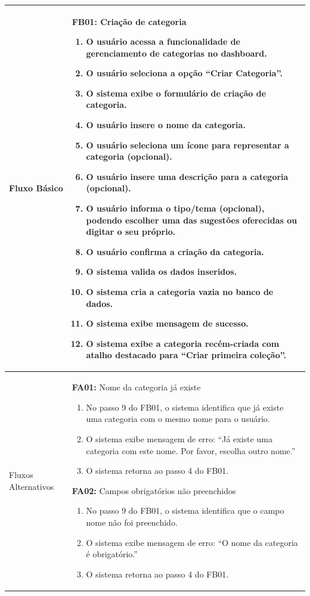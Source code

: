 \begin{longtable}{ >{\raggedright}p{2.8cm} | >{\raggedright\arraybackslash}p{10.7cm} }
Fluxo Básico & \mbox{}
\textbf{FB01:} Criação de categoria
\vspace{2pt}
\begin{enumerate}[nosep,leftmargin=1.2em,topsep=0pt,partopsep=0pt,parsep=0pt,itemsep=0pt,after=\vspace{2pt}]
	\item O usuário acessa a funcionalidade de gerenciamento de categorias no dashboard.
	\item O usuário seleciona a opção ``Criar Categoria''.
	\item O sistema exibe o formulário de criação de categoria.
	\item O usuário insere o nome da categoria.
	\item O usuário seleciona um ícone para representar a categoria (opcional).
	\item O usuário insere uma descrição para a categoria (opcional).
	\item O usuário informa o tipo/tema (opcional), podendo escolher uma das sugestões oferecidas ou digitar o seu próprio.
	\item O usuário confirma a criação da categoria.
	\item O sistema valida os dados inseridos.
	\item O sistema cria a categoria vazia no banco de dados.
	\item O sistema exibe mensagem de sucesso.
	\item O sistema exibe a categoria recém-criada com atalho destacado para ``Criar primeira coleção''.
\end{enumerate}
\mbox{} \\ \hline

Fluxos Alternativos & \mbox{}
\textbf{FA01:} Nome da categoria já existe
\vspace{2pt}
\begin{enumerate}[nosep,leftmargin=1.2em,topsep=0pt,partopsep=0pt,parsep=0pt,itemsep=0pt,after=\vspace{2pt}]
	\item No passo 9 do FB01, o sistema identifica que já existe uma categoria com o mesmo nome para o usuário.
	\item O sistema exibe mensagem de erro: ``Já existe uma categoria com este nome. Por favor, escolha outro nome.''
	\item O sistema retorna ao passo 4 do FB01.
\end{enumerate}

\textbf{FA02:} Campos obrigatórios não preenchidos
\vspace{2pt}
\begin{enumerate}[nosep,leftmargin=1.2em,topsep=0pt,partopsep=0pt,parsep=0pt,itemsep=0pt,after=\vspace{2pt}]
	\item No passo 9 do FB01, o sistema identifica que o campo nome não foi preenchido.
	\item O sistema exibe mensagem de erro: ``O nome da categoria é obrigatório.''
	\item O sistema retorna ao passo 4 do FB01.
\end{enumerate}


\end{longtable}
